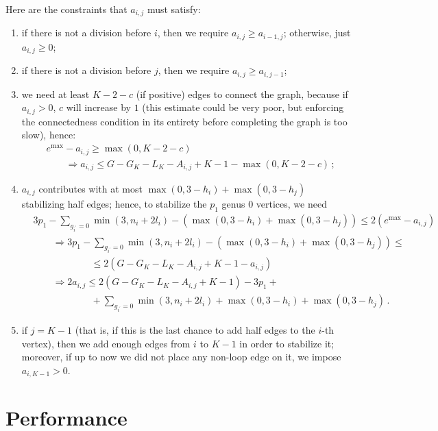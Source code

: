 \documentclass{amsart}
\theoremstyle{plain}
\theoremstyle{definition}
\DeclareMathOperator{\MAX}{max}
\begin{document}
Here are the constraints that $a_{i,j}$ must satisfy:
\begin{enumerate}
\item if there is not a division before $i$, then we require $a_{i,j} \geq
  a_{i-1,j}$; otherwise, just $a_{i,j} \geq 0$;
\item if there is not a division before $j$, then we require $a_{i,j}
  \geq a_{i,j-1}$;
\item we need at least $K-2-c$ (if positive) edges to connect the
  graph, because if $a_{i,j} > 0$, $c$ will increase by $1$ (this
  estimate could be very poor, but enforcing the connectedness
  condition in its entirety before completing the graph is too slow),
  hence:
  \begin{align*}
    &e^{\MAX} - a_{i,j} \geq \max(0, K-2-c)\\
    &\qquad\Rightarrow a_{i,j} \leq G - G_K - L_K - A_{i,j} +K - 1 - \max(0, K-2-c)\,\text{;}
  \end{align*}
\item $a_{i,j}$ contributes with at most $\max(0, 3-h_i) + \max(0,
  3-h_j)$ stabilizing half edges; hence, to stabilize the $p_1$ genus
  $0$ vertices, we need
  \begin{align*}
    &3p_1 - \sum_{g_{i^\prime} = 0} \min(3, n_i + 2l_i) - (\max(0, 3-h_i) + \max(0, 3-h_j)) \leq 2 (e^{\MAX} - a_{i,j})\\
    &\qquad\Rightarrow 3p_1 - \sum_{g_{i^\prime} = 0} \min(3, n_i + 2l_i) - (\max(0, 3-h_i) + \max(0, 3-h_j)) \leq \\
    &\qquad\qquad\qquad \leq 2 (G - G_K - L_K - A_{i,j} + K - 1 - a_{i,j})\\
    &\qquad\Rightarrow 2a_{i,j} \leq 2 (G - G_K - L_K - A_{i,j} + K - 1) - 3p_1 +\\
    &\qquad\qquad\qquad +\sum_{g_{i^\prime} = 0} \min(3, n_i + 2l_i) + \max(0, 3-h_i) + \max(0, 3-h_j)\,\text{.}
  \end{align*}
\item if $j = K-1$ (that is, if this is the last chance to add half
  edges to the $i$-th vertex), then we add enough edges from $i$ to
  $K-1$ in order to stabilize it; moreover, if up to now we did not
  place any non-loop edge on it, we impose $a_{i,K-1} > 0$.
\end{enumerate}



\section{Performance}
\end{document}

